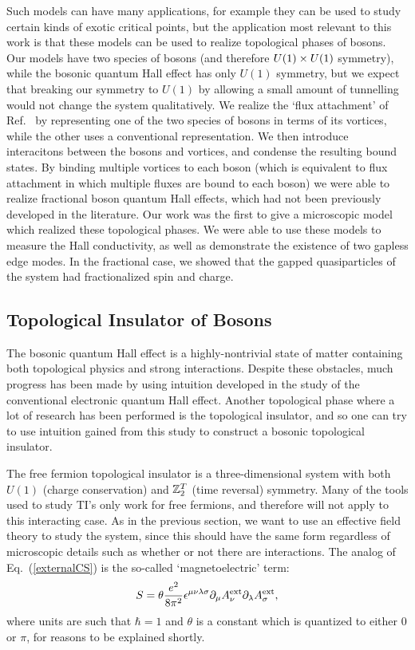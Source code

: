 Such models can have many applications, for example they can be used to study certain kinds of exotic critical points, but the application most relevant to this work is that these models can be used to realize topological phases of bosons. 
Our models have two species of bosons (and therefore $U(1)\times U(1)$ symmetry), while the bosonic quantum Hall effect has only $U(1)$ symmetry, but we expect that breaking our symmetry to $U(1)$ by allowing a small amount of tunnelling would not change the system qualitatively.
We realize the `flux attachment' of Ref.~\cite{SenthilLevin2012} by representing one of the two species of bosons in terms of its vortices, while the other uses a conventional representation. We then introduce interacitons between the bosons and vortices, and condense the resulting bound states. 
By binding multiple vortices to each boson (which is equivalent to flux attachment in which multiple fluxes are bound to each boson) we were able to realize fractional boson quantum Hall effects, which had not been previously developed in the literature.  Our work was the first to give a microscopic model which realized these topological phases. We were able to use these models to measure the Hall conductivity, as well as demonstrate the existence of two gapless edge modes. In the fractional case, we showed that the gapped quasiparticles of the system had fractionalized spin and charge. 

\subsection{Topological Insulator of Bosons}

The bosonic quantum Hall effect is a highly-nontrivial state of matter containing both topological physics and strong interactions. Despite these obstacles, much progress has been made by using intuition developed in the study of the conventional electronic quantum Hall effect. Another topological phase where a lot of research has been performed is the topological insulator, and so one can try to use intuition gained from this study to construct a bosonic topological insulator.

The free fermion topological insulator is a three-dimensional system with both $U(1)$ (charge conservation) and $\mathbb{Z}_2^T$ (time reversal) symmetry. Many of the tools used to study TI's only work for free fermions, and therefore will not apply to this interacting case. As in the previous section, we want to use an effective field theory to study the system, since this should have the same form regardless of microscopic details such as whether or not there are interactions. The analog of Eq.~(\ref{externalCS}) is the so-called `magnetoelectric' term:\cite{QHZ}
\begin{equation}
S=\theta\frac{e^2}{8\pi^2} \epsilon^{\mu\nu\lambda\sigma} \partial_\mu A^{\rm ext}_\nu \partial_\lambda A^{\rm ext}_\sigma,
\label{externEB}
\end{equation}
where units are such that $\hbar=1$ and $\theta$ is a constant which is quantized to either $0$ or $\pi$, for reasons to be explained shortly. 

